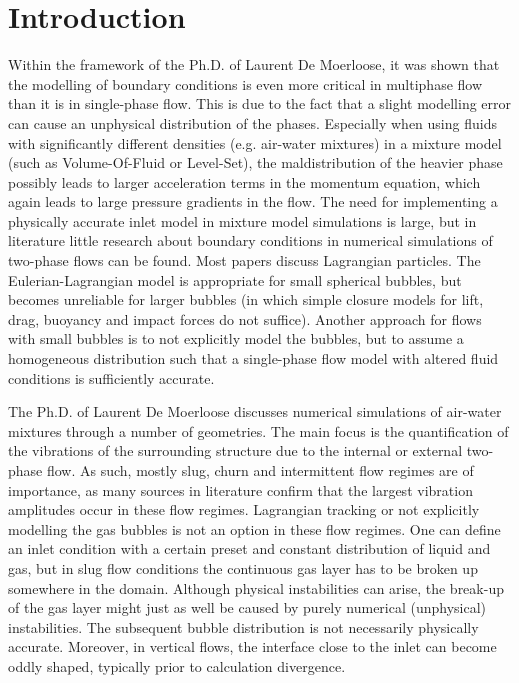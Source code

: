 \documentclass[fleqn,10pt,a4paper,twoside,english]{book}
\begin{document}


\frontmatter
\section*{Introduction \label{introduction}}
Within the framework of the Ph.D. of Laurent De Moerloose, it was shown that the modelling of boundary conditions is even more critical in multiphase flow than it is in single-phase flow. This is due to the fact that a slight modelling error can cause an unphysical distribution of the phases. Especially when using fluids with significantly different densities (e.g. air-water mixtures) in a mixture model (such as Volume-Of-Fluid or Level-Set), the maldistribution of the heavier phase possibly leads to larger acceleration terms in the momentum equation, which again leads to large pressure gradients in the flow. The need for implementing a physically accurate inlet model in mixture model simulations is large, but in literature little research about boundary conditions in numerical simulations of two-phase flows can be found. Most papers discuss Lagrangian particles. The Eulerian-Lagrangian model is appropriate for small spherical bubbles, but becomes unreliable for larger bubbles (in which simple closure models for lift, drag, buoyancy and impact forces do not suffice). Another approach for flows with small bubbles is to not explicitly model the bubbles, but to assume a homogeneous distribution such that a single-phase flow model with altered fluid conditions is sufficiently accurate.
\par The Ph.D. of Laurent De Moerloose discusses numerical simulations of air-water mixtures through a number of geometries. The main focus is the quantification of the vibrations of the surrounding structure due to the internal or external two-phase flow. As such, mostly slug, churn and intermittent flow regimes are of importance, as many sources in literature confirm that the largest vibration amplitudes occur in these flow regimes. Lagrangian tracking or not explicitly modelling the gas bubbles is not an option in these flow regimes. One can define an inlet condition with a certain preset and constant distribution of liquid and gas, but in slug flow conditions the continuous gas layer has to be broken up somewhere in the domain. Although physical instabilities can arise, the break-up of the gas layer might just as well be caused by purely numerical (unphysical) instabilities. The subsequent bubble distribution is not necessarily physically accurate. Moreover, in vertical flows, the interface close to the inlet can become oddly shaped, typically prior to calculation divergence. 
\end{document}
